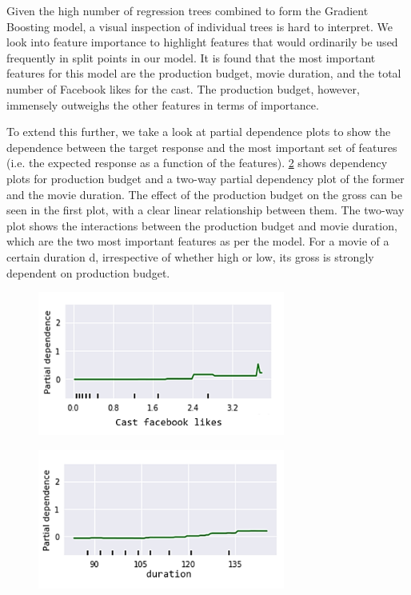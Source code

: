 Given the high number of regression trees combined to form the Gradient Boosting model, a visual inspection of individual trees is hard to interpret. We look into feature importance to highlight features that would ordinarily be used frequently in split points in our model. It is found that the most important features for this model are the production budget, movie duration, and the total number of Facebook likes for the cast. The production budget, however, immensely outweighs the other features in terms of importance. 

To extend this further, we take a look at partial dependence plots to show the dependence between the target response and the most important set of features (i.e. the expected response as a function of the features). \figurename{} \ref{fig:gradient_boost_dependency} shows dependency plots for production budget and a two-way partial dependency plot of the former and the movie duration. The effect of the production budget on the gross can be seen in the first plot, with a clear linear relationship between them. The two-way plot shows the interactions between the production budget and movie duration, which are the two most important features as per the model. For a movie of a certain duration d, irrespective of whether high or low, its gross is strongly dependent on production budget.
\iffalse
\begin{figure}[h]
\centering
\includegraphics[width=3.2in]{figures/gb_dependency_1}
\label{fig:gradient_boost_dependency}
\end{figure}
\begin{figure}[h]
\centering
\includegraphics[width=3.2in]{figures/gb_dependency_2} 
\label{fig:gradient_boost_dependency}
\end{figure}
